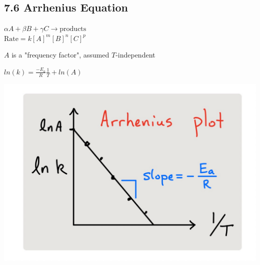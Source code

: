 \subsection{7.6 Arrhenius Equation}
    \vspace*{0.5em}
    $\alpha A + \beta B + \gamma C \longrightarrow \text{products}$\\
    $\text{Rate} = k[A]^m [B]^n [C]^p$


    $A$ is a "frequency factor", assumed $T$-independent
    \vspace*{0.5em}

    \begin{minipage}{0.99\linewidth}
        \begin{minipage}{0.49\linewidth}
            \centerline{$ln(k) = \frac{-E_a}{R} \frac{1}{T} + ln(A)$}
        \end{minipage}
        \begin{minipage}{0.49\linewidth}
            \centerline{\includegraphics[width=0.8\linewidth]{src/7_Kinetics/images/arrhenius_plot.pdf}}
        \end{minipage}
    \end{minipage}